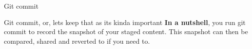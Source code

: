 \begin{frame}{Git commit}
    \begin{block}{Git commit, or, lets keep that as its kinda important}
    \textbf{In a nutshell}, you run git commit to record the snapshot of your staged content. This snapshot can then be compared, shared and reverted to if you need to.
    
    \end{block}
\end{frame}
